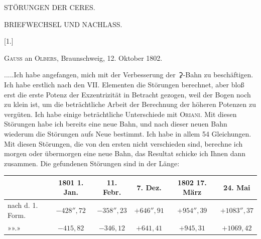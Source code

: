 \clearpage
\thispagestyle{empty}
\vspace*{1.6in}
\begin{center}{\Large STÖRUNGEN DER CERES.\par}\end{center}
\clearpage
{}
\begin{center}
{\large BRIEFWECHSEL UND NACHLASS.\par}
\par
[OKTOBER—DEZEMBER 1802.]\par
\bigskip
{}[1.]\par
\medskip
\textsc{Gauss} an \textsc{Olbers}, Braunschweig, 12. Oktober 1802.
\end{center}
\noindent\hspace*{\parindent}.\quad.\quad.\quad.\quad.\quad Ich habe angefangen, mich mit der Verbesserung der {\AstroSymbols ⚳}-Bahn zu beschäftigen. Ich habe erstlich nach den VII. Elementen die Störungen berechnet, aber bloß erst die erste Potenz der Exzentrizität in Betracht gezogen, weil der Bogen noch zu klein ist, um die beträchtliche Arbeit der Berechnung der höheren Potenzen zu vergüten. Ich habe einige beträchtliche Unterschiede mit \textsc{Oriani}. Mit diesen Störungen habe ich bereits eine neue Bahn, und nach dieser neuen Bahn wiederum die Störungen aufs Neue bestimmt. Ich habe in allem 54 Gleichungen. Mit diesen Störungen, die von den ersten nicht  verschieden sind, berechne ich morgen oder übermorgen eine neue Bahn, das Resultat schicke ich Ihnen dann zusammen. Die gefundenen Störungen sind in der Länge:
\begin{center}
\begingroup\footnotesize\setlength{\tabcolsep}{4pt}\renewcommand{\arraystretch}{1.25}
\begin{tabular}{l|c|c|c|c|c}
 & 1801 1. Jan. & 11. Febr. & 7. Dez. & 1802 17. März & 24. Mai\\
\hline
nach d. 1. Form. & \(-428''{,}72\) & \(-358''{,}23\) & \(+646''{,}91\) & \(+954''{,}39\) & \(+1083''{,}37\)\\
»\quad »\quad 2.\quad » & \(-415{,}82\) & \(-346{,}12\) & \(+641{,}41\) & \(+945{,}31\) & \(+1069{,}42\)\\
\end{tabular}\endgroup
\end{center}
